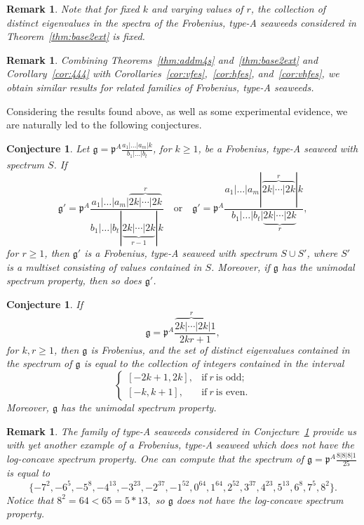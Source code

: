 \documentclass[letterpaper,10pt]{article}
\newtheorem{conj}[theorem]{Conjecture}
\newtheorem{remark}[theorem]{Remark}
\begin{document}
\begin{remark}
Note that for fixed $k$ and varying values of $r$, the collection of distinct eigenvalues in the spectra of the Frobenius, type-A seaweeds considered in Theorem~\ref{thm:base2ext} is fixed.
\end{remark}

\begin{remark}
    Combining Theorems~\ref{thm:addm4s} and~\ref{thm:base2ext} and Corollary~\ref{cor:444} with Corollaries~\ref{cor:vfes},~\ref{cor:hfes}, and~\ref{cor:vhfes}, we obtain similar results for related families of Frobenius, type-A seaweeds.
\end{remark}

Considering the results found above, as well as some experimental evidence, we are naturally led to the following conjectures.

\begin{conj}\label{conj:stab1}
Let $\mathfrak{g}=\mathfrak{p}^A\frac{a_1|\hdots|a_m|k}{b_1|\hdots|b_t}$, for $k\ge 1$, be a Frobenius, type-A seaweed with spectrum $S$. If
$$\mathfrak{g}'=\mathfrak{p}^A\frac{a_1|\hdots|a_m|\overbrace{2k|\cdots|2k}^r}{b_1|\hdots|b_t|\underbrace{2k|\cdots|2k}_{r-1}|k}\quad\text{or}\quad\mathfrak{g}'=\mathfrak{p}^A\frac{a_1|\hdots|a_m|\overbrace{2k|\cdots|2k}^r|k}{b_1|\hdots|b_t|\underbrace{2k|\cdots|2k}_{r}},$$ for $r\ge 1$, then $\mathfrak{g}'$ is a Frobenius, type-A seaweed with spectrum $S\cup S'$, where $S'$ is a multiset consisting of values contained in $S$. Moreover, if $\mathfrak{g}$ has the unimodal spectrum property, then so does $\mathfrak{g}'$.
\end{conj}

\begin{conj}\label{conj:stab2}
If $$\mathfrak{g}=\mathfrak{p}^A\frac{\overbrace{2k|\cdots|2k}^r|1}{2kr+1},$$ for $k,r\ge 1$, then $\mathfrak{g}$ is Frobenius, and the set of distinct eigenvalues contained in the spectrum of $\mathfrak{g}$ is equal to the collection of integers contained in the interval
$$\begin{cases}
    [-2k+1,2k], & \text{if}~r~\text{is odd}; \\
    [-k,k+1], & \text{if}~r~\text{is even}.
\end{cases}$$
Moreover, $\mathfrak{g}$ has the unimodal spectrum property.
\end{conj}


\begin{remark}
The family of type-A seaweeds considered in Conjecture~\ref{conj:stab2} provide us with yet another example of a Frobenius, type-A seaweed which does not have the log-concave spectrum property. One can compute that the spectrum of $\mathfrak{g}=\mathfrak{p}^A\frac{8|8|8|1}{25}$ is equal to $$\{-7^2,-6^5,-5^8,-4^{13},-3^{23},-2^{37},-1^{52},0^{64},1^{64},2^{52},3^{37},4^{23},5^{13},6^8,7^5,8^2\}.$$ Notice that $8^2=64<65=5*13,$ so $\mathfrak{g}$ does not have the log-concave spectrum property.
\end{remark}
\end{document}
